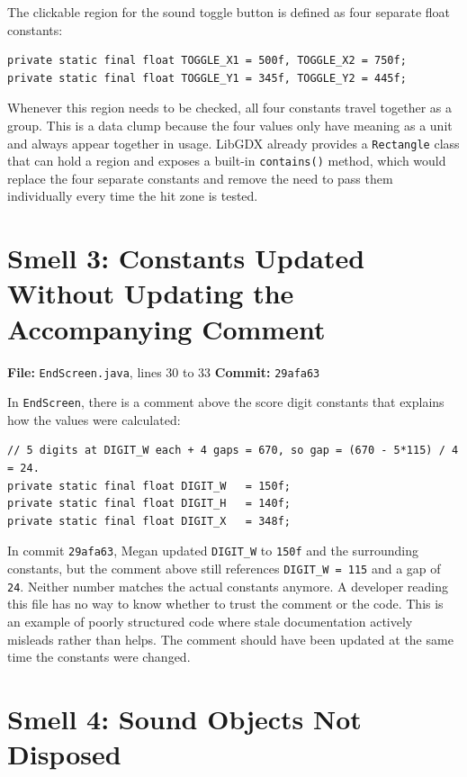 \documentclass[10pt]{article}
\begin{document}
The clickable region for the sound toggle button is defined as four separate
float constants:

\begin{lstlisting}
private static final float TOGGLE_X1 = 500f, TOGGLE_X2 = 750f;
private static final float TOGGLE_Y1 = 345f, TOGGLE_Y2 = 445f;
\end{lstlisting}

Whenever this region needs to be checked, all four constants travel together
as a group. This is a data clump because the four values only have meaning
as a unit and always appear together in usage. LibGDX already provides a
\texttt{Rectangle} class that can hold a region and exposes a built-in
\texttt{contains()} method, which would replace the four separate constants
and remove the need to pass them individually every time the hit zone is tested.

\section{Smell 3: Constants Updated Without Updating the Accompanying Comment}

\textbf{File:} \texttt{EndScreen.java}, lines 30 to 33 \quad
\textbf{Commit:} \texttt{29afa63}

In \texttt{EndScreen}, there is a comment above the score digit constants that
explains how the values were calculated:

\begin{lstlisting}
// 5 digits at DIGIT_W each + 4 gaps = 670, so gap = (670 - 5*115) / 4 = 24.
private static final float DIGIT_W   = 150f;
private static final float DIGIT_H   = 140f;
private static final float DIGIT_X   = 348f;
\end{lstlisting}

In commit \texttt{29afa63}, Megan updated \texttt{DIGIT\_W} to \texttt{150f}
and the surrounding constants, but the comment above still references
\texttt{DIGIT\_W = 115} and a gap of \texttt{24}. Neither number matches
the actual constants anymore. A developer reading this file has no way to
know whether to trust the comment or the code. This is an example of poorly
structured code where stale documentation actively misleads rather than helps.
The comment should have been updated at the same time the constants were changed.

\section{Smell 4: Sound Objects Not Disposed}
\end{document}
